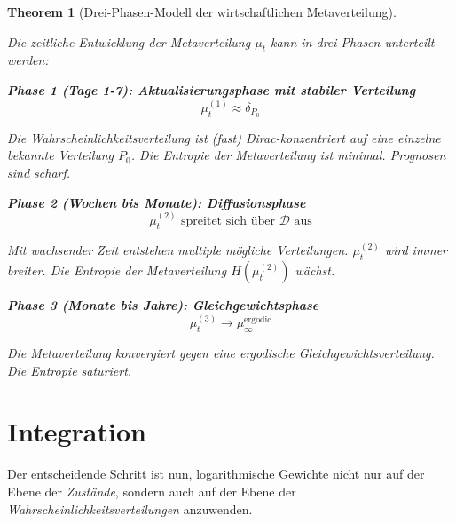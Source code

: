 \documentclass[12pt, a4paper, titlepage]{report}
\newtheorem{theorem}{Theorem}[section]
\theoremstyle{definition}
\theoremstyle{remark}
\begin{document}
\begin{theorem}[Drei-Phasen-Modell der wirtschaftlichen Metaverteilung]
\label{thm:three_phases_meta}

Die zeitliche Entwicklung der Metaverteilung $\mu_t$ kann in drei Phasen unterteilt werden:

\textbf{Phase 1 (Tage 1-7): Aktualisierungsphase mit stabiler Verteilung}
\begin{equation}
\mu_t^{(1)} \approx \delta_{P_0}
\end{equation}

Die Wahrscheinlichkeitsverteilung ist (fast) Dirac-konzentriert auf eine einzelne bekannte Verteilung $P_0$. Die Entropie der Metaverteilung ist minimal. Prognosen sind scharf.

\textbf{Phase 2 (Wochen bis Monate): Diffusionsphase}
\begin{equation}
\mu_t^{(2)} \text{ spreitet sich über } \mathcal{D} \text{ aus}
\end{equation}

Mit wachsender Zeit entstehen multiple mögliche Verteilungen. $\mu_t^{(2)}$ wird immer breiter. Die Entropie der Metaverteilung $H(\mu_t^{(2)})$ wächst.

\textbf{Phase 3 (Monate bis Jahre): Gleichgewichtsphase}
\begin{equation}
\mu_t^{(3)} \to \mu_{\infty}^{\text{ergodic}}
\end{equation}

Die Metaverteilung konvergiert gegen eine ergodische Gleichgewichtsverteilung. Die Entropie saturiert.
\end{theorem}

\section{Integration}

Der entscheidende Schritt ist nun, logarithmische Gewichte nicht nur auf der Ebene der \emph{Zustände}, sondern auch auf der Ebene der \emph{Wahrscheinlichkeitsverteilungen} anzuwenden.
\end{document}

